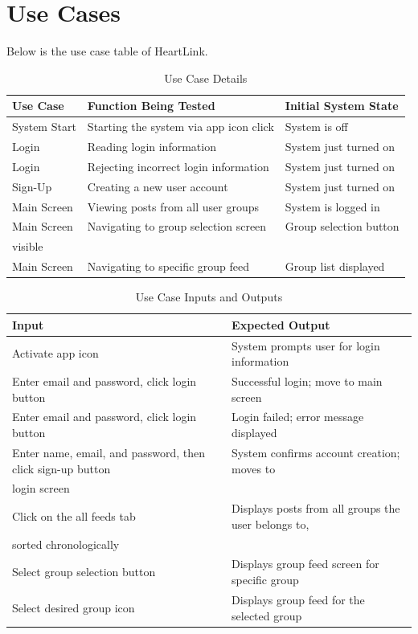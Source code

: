 \documentclass[conference]{IEEEtran}
\begin{document}
\section{Use Cases}
Below is the use case table of HeartLink.\\
\begin{table}[H] %
    \centering
    \caption{Use Case Details}
    \renewcommand{\arraystretch}{1.2} %
    \begin{tabular}{|p{2.5cm}|p{4cm}|p{3.5cm}|}
    \hline
    \textbf{Use Case} & \textbf{Function Being Tested} & \textbf{Initial System State} \\ \hline
    System Start & Starting the system via app icon click & System is off \\ \hline
    Login & Reading login information & System just turned on \\ \hline
    Login & Rejecting incorrect login information & System just turned on \\ \hline
    Sign-Up & Creating a new user account & System just turned on \\ \hline
    Main Screen & Viewing posts from all user groups & System is logged in \\ \hline
    Main Screen & Navigating to group selection screen & Group selection button\\ visible \\ \hline
    Main Screen & Navigating to specific group feed & Group list displayed \\ \hline
    \end{tabular}
    \label{tab:use_case_details}
\end{table}
\begin{table}[H] %
    \centering
    \caption{Use Case Inputs and Outputs}
    \renewcommand{\arraystretch}{1.2} %
    \begin{tabular}{|p{3.5cm}|p{6.5cm}|}
    \hline
    \textbf{Input} & \textbf{Expected Output} \\ \hline
    Activate app icon & System prompts user for login information \\ \hline
    Enter email and password, click login button & Successful login; move to main screen \\ \hline
    Enter email and password, click login button & Login failed; error message displayed \\ \hline
    Enter name, email, and password, then click sign-up button & System confirms account creation; moves to\\login screen \\ \hline
    Click on the all feeds tab & Displays posts from all groups the user belongs to,\\sorted chronologically \\ \hline
    Select group selection button & Displays group feed screen for specific group \\ \hline
    Select desired group icon & Displays group feed for the selected group \\ \hline
    \end{tabular}
    \label{tab:use_case_io}
\end{table}
\end{document}
